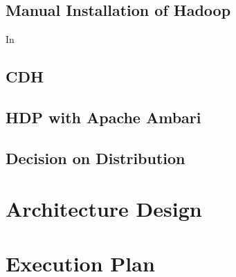 \subsection{Manual Installation of Hadoop}

In \autoc

\subsection{\acl{CDH}}

\subsection{\acl{HDP} with Apache Ambari}

\subsection{Decision on Distribution}

\section{Architecture Design}

\section{Execution Plan}
